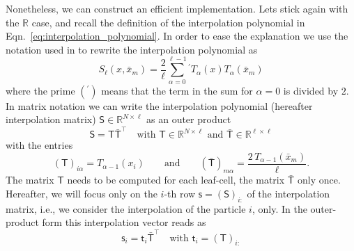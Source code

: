 \documentclass[]{article}
\newcommand{\Mat}[1]{\mathsf{#1}}  %
\theoremstyle{plain}
\begin{document}
Nonetheless, we can construct an efficient implementation. Lets stick again
with the $\mathbb{R}$ case, and recall the definition of the interpolation
polynomial in Eqn.~\eqref{eq:interpolation_polynomial}. In order to ease the
explanation we use the notation used in \citep[]{mason2003chebyshev} to rewrite
the interpolation polynomial as
\begin{equation}
  \label{eq:masonnotationinterpol}
  S_\ell(x,\bar x_m) = \frac{2}{\ell} \sum_{\alpha=0}^{\ell-1}{}^\prime
  T_\alpha(x) T_\alpha(\bar x_m)
\end{equation}
where the prime $(^\prime)$ means that the term in the sum for $\alpha=0$ is
divided by $2$. In matrix notation we can write the interpolation polynomial
(hereafter interpolation matrix) $\Mat{S} \in \mathbb{R}^{N\times\ell}$ as an
outer product
\begin{equation}
  \label{eq:interpolouterprod}
  \Mat{S} = \Mat{T} \Mat{\bar T}^\top \quad \text{with }
  \Mat{T} \in \mathbb{R}^{N\times\ell} \text{ and } \Mat{\bar T} \in
  \mathbb{R}^{\ell\times\ell} 
\end{equation}
with the entries
\begin{equation}
  \label{eq:entriesouterprodinterpol}
  (\Mat{T})_{i\alpha} = T_{\alpha-1}(x_i)
  \qquad \text{and} \qquad   
  (\Mat{\bar T})_{m\alpha} = \frac{2\,T_{\alpha-1}(\bar x_m)}{\ell}. 
\end{equation}
The matrix $\Mat{T}$ needs to be computed for each leaf-cell, the matrix
$\Mat{\bar T}$ only once. Hereafter, we will focus only on the $i$-th row
$\Mat{s} = (\Mat{S})_{i:}$ of the interpolation matrix, i.e., we consider the
interpolation of the particle $i$, only. In the outer-product form this
interpolation vector reads as
\begin{equation}
  \label{eq:rowouterprodinterpol}
  \Mat{s}_i = \Mat{t}_i \Mat{\bar T}^\top \quad \text{with } \Mat{t}_i =
  (\Mat{T})_{i:}
\end{equation}
\end{document}
